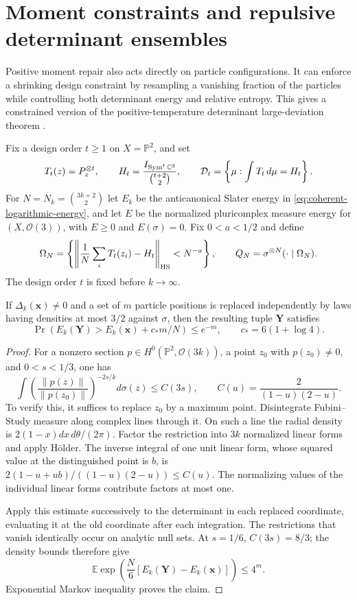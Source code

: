 \section{Moment constraints and repulsive determinant ensembles}
\label{sec:repulsive-constraints}

Positive moment repair also acts directly on particle configurations.
It can enforce a shrinking design constraint by resampling a vanishing
fraction of the particles while controlling both determinant energy
and relative entropy.  This gives a constrained version of the
positive-temperature determinant large-deviation theorem
\cite{prob_berman2017}.

Fix a design order $t\geq1$ on $X=\mathbb P^2$, and set
\[
 T_t(z)=P_z^{\otimes t},\qquad
 H_t=\frac{I_{\operatorname{Sym}^t\mathbb C^3}}{\binom{t+2}{2}},\qquad
 \mathcal D_t=\left\{\mu:\int T_t\,d\mu=H_t\right\}.
\]
For $N=N_k=\binom{3k+2}{2}$ let $E_k$ be the anticanonical Slater
energy in \eqref{eq:coherent-logarithmic-energy}, and let $E$ be the
normalized pluricomplex measure energy for $(X,\mathcal O(3))$,
with $E\geq0$ and $E(\sigma)=0$.  Fix $0<a<1/2$
and define
\[
 \Omega_N=\left\{\left\|\frac1N\sum_iT_t(z_i)-H_t\right\|_{\operatorname{HS}}
                      <N^{-a}\right\},
 \qquad Q_N=\sigma^{\otimes N}(\cdot\mid\Omega_N).
\]
The design order $t$ is fixed before $k\to\infty$.

\begin{lemma}
\label{lem:conditional-replacement}
If $\Delta_k(\boldsymbol x)\ne0$ and a set of $m$ particle positions
is replaced independently by laws having densities at most $3/2$
against $\sigma$, then the resulting tuple $\boldsymbol Y$ satisfies
\[
 \Pr\!\left(E_k(\boldsymbol Y)>E_k(\boldsymbol x)
                   +c_*m/N\right)\leq e^{-m},
 \qquad c_*=6(1+\log4).
\]
\end{lemma}

\begin{proof}
For a nonzero section $p\in H^0(\mathbb P^2,\mathcal O(3k))$,
a point $z_0$ with $p(z_0)\ne0$, and $0<s<1/3$, one has
\[
 \int\left(\frac{\|p(z)\|}{\|p(z_0)\|}\right)^{-2s/k}d\sigma(z)
 \leq C(3s),\qquad C(u)=\frac2{(1-u)(2-u)}.
\]
To verify this, it suffices to replace $z_0$ by a maximum point.
Disintegrate Fubini--Study measure along complex lines through it.
On such a line the radial density is $2(1-x)dx\,d\theta/(2\pi)$.
Factor the restriction into $3k$ normalized linear forms and apply
H\"older.  The inverse integral of one unit linear form, whose
squared value at the distinguished point is $b$, is
$2(1-u+ub)/((1-u)(2-u))\leq C(u)$.  The normalizing values of the
individual linear forms contribute factors at most one.

Apply this estimate successively to the determinant in each replaced
coordinate, evaluating it at the old coordinate after each integration.
The restrictions that vanish identically occur on analytic null sets.
At $s=1/6$, $C(3s)=8/3$; the density bounds therefore give
\[
 \mathbb E\exp\left(\frac N6
       [E_k(\boldsymbol Y)-E_k(\boldsymbol x)]\right)\leq4^m.
\]
Exponential Markov inequality proves the claim.
\end{proof}


